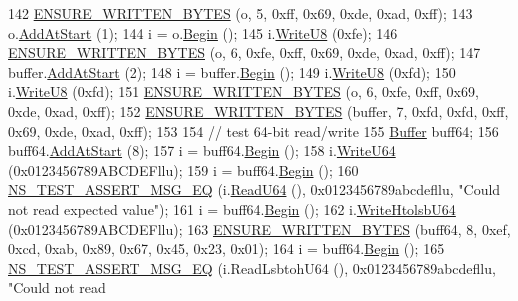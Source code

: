 \begin{DoxyCode}
142   \hyperlink{buffer-test_8cc_adb8db1b0f6eec9da1f9f6d8b9f1e4ba8}{ENSURE\_WRITTEN\_BYTES} (o, 5, 0xff, 0x69, 0xde, 0xad, 0xff);
143   o.\hyperlink{classns3_1_1Buffer_a8abd8164c3671d3dadc98fc66fade7b1}{AddAtStart} (1);
144   i = o.\hyperlink{classns3_1_1Buffer_a893d4bf50df13e730b6cd0fda91b967f}{Begin} ();
145   i.\hyperlink{classns3_1_1Buffer_1_1Iterator_a3c7bacca6cbb821c9d14fa4626b7ae16}{WriteU8} (0xfe);
146   \hyperlink{buffer-test_8cc_adb8db1b0f6eec9da1f9f6d8b9f1e4ba8}{ENSURE\_WRITTEN\_BYTES} (o, 6, 0xfe, 0xff, 0x69, 0xde, 0xad, 0xff);
147   buffer.\hyperlink{classns3_1_1Buffer_a8abd8164c3671d3dadc98fc66fade7b1}{AddAtStart} (2);
148   i = buffer.\hyperlink{classns3_1_1Buffer_a893d4bf50df13e730b6cd0fda91b967f}{Begin} ();
149   i.\hyperlink{classns3_1_1Buffer_1_1Iterator_a3c7bacca6cbb821c9d14fa4626b7ae16}{WriteU8} (0xfd);
150   i.\hyperlink{classns3_1_1Buffer_1_1Iterator_a3c7bacca6cbb821c9d14fa4626b7ae16}{WriteU8} (0xfd);
151   \hyperlink{buffer-test_8cc_adb8db1b0f6eec9da1f9f6d8b9f1e4ba8}{ENSURE\_WRITTEN\_BYTES} (o, 6, 0xfe, 0xff, 0x69, 0xde, 0xad, 0xff);
152   \hyperlink{buffer-test_8cc_adb8db1b0f6eec9da1f9f6d8b9f1e4ba8}{ENSURE\_WRITTEN\_BYTES} (buffer, 7, 0xfd, 0xfd, 0xff, 0x69, 0xde, 0xad, 0xff);
153 
154   \textcolor{comment}{// test 64-bit read/write}
155   \hyperlink{classns3_1_1Buffer}{Buffer} buff64;
156   buff64.\hyperlink{classns3_1_1Buffer_a8abd8164c3671d3dadc98fc66fade7b1}{AddAtStart} (8);
157   i = buff64.\hyperlink{classns3_1_1Buffer_a893d4bf50df13e730b6cd0fda91b967f}{Begin} ();
158   i.\hyperlink{classns3_1_1Buffer_1_1Iterator_a013618ba6e5a062d1b097a6109572783}{WriteU64} (0x0123456789ABCDEFllu);
159   i = buff64.\hyperlink{classns3_1_1Buffer_a893d4bf50df13e730b6cd0fda91b967f}{Begin} ();
160   \hyperlink{group__testing_ga2a9d78cffb3db8e867c35fff0b698cf5}{NS\_TEST\_ASSERT\_MSG\_EQ} (i.\hyperlink{classns3_1_1Buffer_1_1Iterator_aba1fa5272c0fa3455f59a70db5c9d976}{ReadU64} (), 0x0123456789abcdefllu, \textcolor{stringliteral}{"Could not read
       expected value"});
161   i = buff64.\hyperlink{classns3_1_1Buffer_a893d4bf50df13e730b6cd0fda91b967f}{Begin} ();
162   i.\hyperlink{classns3_1_1Buffer_1_1Iterator_a930c087b76db8b535f224b4eb916c359}{WriteHtolsbU64} (0x0123456789ABCDEFllu);
163   \hyperlink{buffer-test_8cc_adb8db1b0f6eec9da1f9f6d8b9f1e4ba8}{ENSURE\_WRITTEN\_BYTES} (buff64, 8, 0xef, 0xcd, 0xab, 0x89, 0x67, 0x45, 0x23, 0x01);
164   i = buff64.\hyperlink{classns3_1_1Buffer_a893d4bf50df13e730b6cd0fda91b967f}{Begin} ();
165   \hyperlink{group__testing_ga2a9d78cffb3db8e867c35fff0b698cf5}{NS\_TEST\_ASSERT\_MSG\_EQ} (i.ReadLsbtohU64 (), 0x0123456789abcdefllu, \textcolor{stringliteral}{"Could not read
}
\end{DoxyCode}
